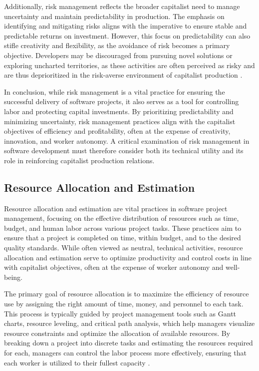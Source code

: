 \begin{refsection}
Additionally, risk management reflects the broader capitalist need to manage uncertainty and maintain predictability in production. The emphasis on identifying and mitigating risks aligns with the imperative to ensure stable and predictable returns on investment. However, this focus on predictability can also stifle creativity and flexibility, as the avoidance of risk becomes a primary objective. Developers may be discouraged from pursuing novel solutions or exploring uncharted territories, as these activities are often perceived as risky and are thus deprioritized in the risk-averse environment of capitalist production \cite[pp.~112-115]{Beck2016ExtremeProgramming}.

In conclusion, while risk management is a vital practice for ensuring the successful delivery of software projects, it also serves as a tool for controlling labor and protecting capital investments. By prioritizing predictability and minimizing uncertainty, risk management practices align with the capitalist objectives of efficiency and profitability, often at the expense of creativity, innovation, and worker autonomy. A critical examination of risk management in software development must therefore consider both its technical utility and its role in reinforcing capitalist production relations.

\subsection{Resource Allocation and Estimation}

Resource allocation and estimation are vital practices in software project management, focusing on the effective distribution of resources such as time, budget, and human labor across various project tasks. These practices aim to ensure that a project is completed on time, within budget, and to the desired quality standards. While often viewed as neutral, technical activities, resource allocation and estimation serve to optimize productivity and control costs in line with capitalist objectives, often at the expense of worker autonomy and well-being.

The primary goal of resource allocation is to maximize the efficiency of resource use by assigning the right amount of time, money, and personnel to each task. This process is typically guided by project management tools such as Gantt charts, resource leveling, and critical path analysis, which help managers visualize resource constraints and optimize the allocation of available resources. By breaking down a project into discrete tasks and estimating the resources required for each, managers can control the labor process more effectively, ensuring that each worker is utilized to their fullest capacity \cite[pp.~145-147]{Fleming2005ProjectManagement}.


\end{refsection}
